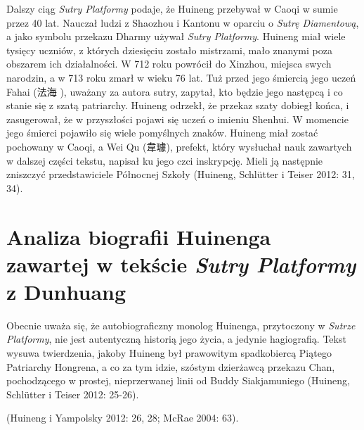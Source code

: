 Dalszy ciąg \textit{Sutry Platformy} podaje, że Huineng przebywał w Caoqi w sumie przez 40 lat.
Nauczał ludzi z Shaozhou i Kantonu w oparciu o \textit{Sutrę Diamentową}, a jako symbolu przekazu Dharmy używał \textit{Sutry Platformy}. Huineng miał wiele tysięcy uczniów, z których dziesięciu zostało mistrzami, mało znanymi poza obszarem ich działalności.
W 712 roku powrócił do Xinzhou, miejsca swych narodzin, a w 713 roku zmarł w wieku 76 lat.
Tuż przed jego śmiercią jego uczeń Fahai (法海 ), uważany za autora sutry, zapytał, kto będzie jego następcą i co stanie się z szatą patriarchy.
Huineng odrzekł, że przekaz szaty dobiegł końca, i zasugerował, że w przyszłości pojawi się uczeń o imieniu Shenhui. W momencie jego śmierci pojawiło się wiele pomyślnych znaków. Huineng miał zostać pochowany w Caoqi, a Wei Qu (韋璩), prefekt, który wysłuchał nauk zawartych w dalszej części tekstu, napisał ku jego czci inskrypcję. Mieli ją następnie zniszczyć przedstawiciele Północnej Szkoły
(Huineng, Schlütter i Teiser 2012: 31, 34).


\section{Analiza biografii Huinenga zawartej w tekście \textit{Sutry Platformy} z Dunhuang}
Obecnie uważa się, że autobiograficzny monolog Huinenga, przytoczony w \textit{Sutrze Platformy}, nie jest autentyczną historią jego życia, a jedynie hagiografią. Tekst wysuwa twierdzenia, jakoby Huineng był prawowitym spadkobiercą Piątego Patriarchy Hongrena, a co za tym idzie, szóstym dzierżawcą przekazu Chan, pochodzącego w prostej, nieprzerwanej linii od Buddy Siakjamuniego
(Huineng, Schlütter i Teiser 2012: 25-26). %


(Huineng i Yampolsky 2012: 26, 28; McRae 2004: 63).

